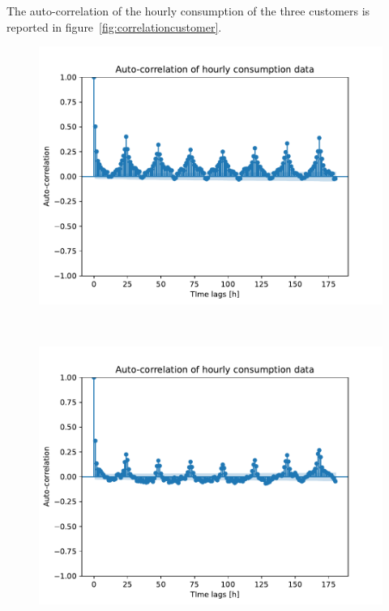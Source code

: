 The auto-correlation of the hourly consumption of the three customers is reported in figure~\ref{fig:correlationcustomer}. %

\begin{figure}[H]
\begin{minipage}[b]{8.5cm}
\centering
\includegraphics[width=1\textwidth]{images/baseline/hourly_correlation_week_range_customer1}
\label{fig:correlationcustomer1}
\end{minipage}
\ \hspace{2mm} \
\begin{minipage}[b]{8.5cm}
\centering
\includegraphics[width=1\textwidth]{images/baseline/hourly_correlation_week_range_customer2}

\end{minipage}
\end{figure}
